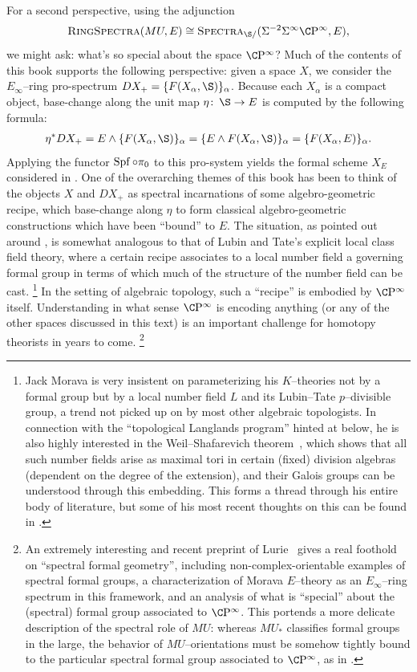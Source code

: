 For a second perspective, using the adjunction \[\CatOf{RingSpectra}(MU, E) \cong \CatOf{Spectra}_{\S/}(\Susp^{-2} \Susp^\infty \CP^\infty, E),\] we might ask: what's so special about the space \(\CP^\infty\)?
Much of the contents of this book supports the following perspective: given a space \(X\), we consider the \(E_\infty\)--ring pro-spectrum \(DX_+ = \{F(X_\alpha, \S)\}_\alpha\).
Because each \(X_\alpha\) is a compact object, base-change along the unit map \(\eta\co \S \to E\) is computed by the following formula:
\begin{align*}
\eta^* DX_+ = E \sm \{F(X_\alpha, \S)\}_\alpha = \{E \sm F(X_\alpha, \S)\}_\alpha = \{F(X_\alpha, E)\}_\alpha.
\end{align*}
Applying the functor \(\operatorname{Spf} \circ \pi_0\) to this pro-system yields the formal scheme \(X_E\) considered in .
One of the overarching themes of this book has been to think of the objects \(X\) and \(DX_+\) as spectral incarnations of some algebro-geometric recipe, which base-change along \(\eta\) to form classical algebro-geometric constructions which have been ``bound'' to \(E\).
The situation, as pointed out around , is somewhat analogous to that of Lubin and Tate's explicit local class field theory, where a certain recipe associates to a local number field a governing formal group in terms of which much of the structure of the number field can be cast.%
\footnote{%
Jack Morava is very insistent on parameterizing his \(K\)--theories not by a formal group but by a local number field \(L\) and its Lubin--Tate \(p\)--divisible group, a trend not picked up on by most other algebraic topologists.
In connection with the ``topological Langlands program'' hinted at below, he is also highly interested in the Weil--Shafarevich theorem~\cite[Appendix III]{Weil}, which shows that all such number fields arise as maximal tori in certain (fixed) division algebras (dependent on the degree of the extension), and their Galois groups can be understood through this embedding.
This forms a thread through his entire body of literature, but some of his most recent thoughts on this can be found in \cite{MoravaTHH}.
}
In the setting of algebraic topology, such a ``recipe'' is embodied by \(\CP^\infty\) itself.
Understanding in what sense \(\CP^\infty\) is encoding anything (or any of the other spaces discussed in this text) is an important challenge for homotopy theorists in years to come.%
\footnote{%
An extremely interesting and recent preprint of Lurie~\cite{LurieEllII} gives a real foothold on ``spectral formal geometry'', including non-complex-orientable examples of spectral formal groups, a characterization of Morava \(E\)--theory as an \(E_\infty\)--ring spectrum in this framework, and an analysis of what is ``special'' about the (spectral) formal group associated to \(\CP^\infty\).
This portends a more delicate description of the spectral role of \(MU\): whereas \(MU_*\) classifies formal groups in the large, the behavior of \(MU\)--orientations must be somehow tightly bound to the particular spectral formal group associated to \(\CP^\infty\), as in .
}

